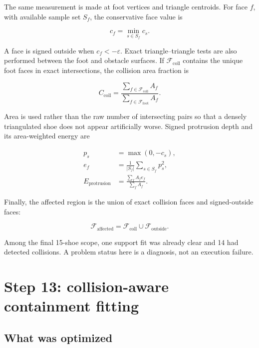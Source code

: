 \documentclass[11pt]{article}
\begin{document}
The same measurement is made at foot vertices and triangle centroids. For face $f$,
with available sample set $S_f$, the conservative face value is

\begin{equation}
  c_f=\min_{s\in S_f}c_s.
\end{equation}

A face is signed outside when $c_f<-\varepsilon$. Exact triangle--triangle tests are
also performed between the foot and obstacle surfaces. If
$\mathcal F_{\mathrm{coll}}$ contains the unique foot faces in exact intersections, the
collision area fraction is

\begin{equation}
  C_{\mathrm{coll}}=
  \frac{\sum_{f\in\mathcal F_{\mathrm{coll}}}A_f}
       {\sum_{f\in\mathcal F_{\mathrm{foot}}}A_f}.
  \label{eq:collision-area}
\end{equation}

Area is used rather than the raw number of intersecting pairs so that a densely
triangulated shoe does not appear artificially worse. Signed protrusion depth and its
area-weighted energy are

\begin{align}
  p_s &= \max(0,-c_s),\\
  e_f &= \frac{1}{|S_f|}\sum_{s\in S_f}p_s^2,\\
  E_{\mathrm{protrusion}} &=
  \frac{\sum_f A_f e_f}{\sum_f A_f}.
  \label{eq:protrusion-energy}
\end{align}

Finally, the affected region is the union of exact collision faces and signed-outside
faces:

\begin{equation}
  \mathcal F_{\mathrm{affected}}
  =\mathcal F_{\mathrm{coll}}\cup\mathcal F_{\mathrm{outside}}.
\end{equation}

Among the final 15-shoe scope, one support fit was already clear and 14 had detected
collisions. A problem status here is a diagnosis, not an execution failure.

\section{Step 13: collision-aware containment fitting}
\label{sec:containment}

\subsection{What was optimized}
\end{document}
